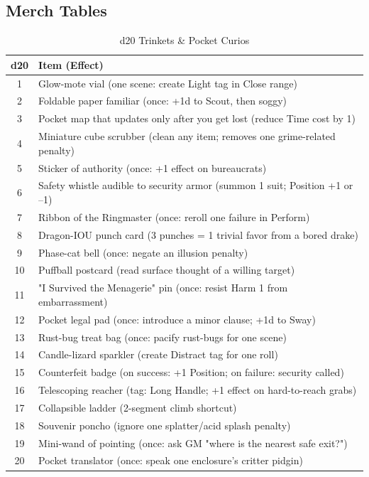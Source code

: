 \subsection{Merch Tables}

\begin{table}[h]
\centering
\caption{d20 Trinkets \& Pocket Curios}
\label{tab:trinkets}
\begin{tabular}{@{}cl@{}}
\toprule
d20 & Item (Effect) \\
\midrule
1 & Glow-mote vial (one scene: create Light tag in Close range) \\
2 & Foldable paper familiar (once: +1d to Scout, then soggy) \\
3 & Pocket map that updates only after you get lost (reduce Time cost by 1) \\
4 & Miniature cube scrubber (clean any item; removes one grime-related penalty) \\
5 & Sticker of authority (once: +1 effect on bureaucrats) \\
6 & Safety whistle audible to security armor (summon 1 suit; Position +1 or --1) \\
7 & Ribbon of the Ringmaster (once: reroll one failure in Perform) \\
8 & Dragon-IOU punch card (3 punches = 1 trivial favor from a bored drake) \\
9 & Phase-cat bell (once: negate an illusion penalty) \\
10 & Puffball postcard (read surface thought of a willing target) \\
11 & "I Survived the Menagerie" pin (once: resist Harm 1 from embarrassment) \\
12 & Pocket legal pad (once: introduce a minor clause; +1d to Sway) \\
13 & Rust-bug treat bag (once: pacify rust-bugs for one scene) \\
14 & Candle-lizard sparkler (create Distract tag for one roll) \\
15 & Counterfeit badge (on success: +1 Position; on failure: security called) \\
16 & Telescoping reacher (tag: Long Handle; +1 effect on hard-to-reach grabs) \\
17 & Collapsible ladder (2-segment climb shortcut) \\
18 & Souvenir poncho (ignore one splatter/acid splash penalty) \\
19 & Mini-wand of pointing (once: ask GM "where is the nearest safe exit?") \\
20 & Pocket translator (once: speak one enclosure's critter pidgin) \\
\bottomrule
\end{tabular}
\end{table}

